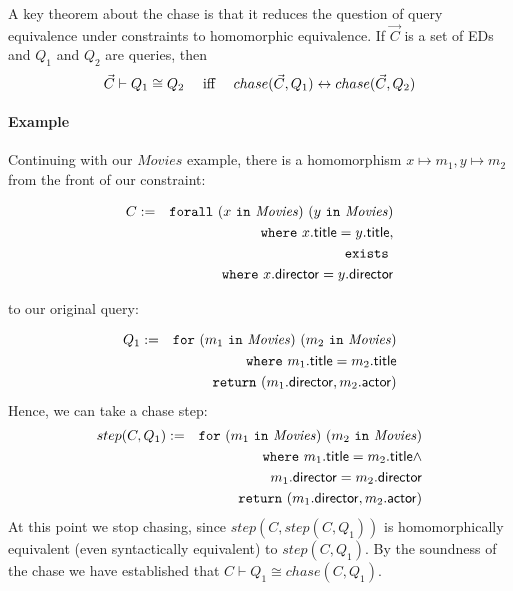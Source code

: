 \documentclass[preprint]{sigplanconf}
\newcommand{\FOR}{{\tt for} \ }
\newcommand{\FORALL}{{\tt forall} \ }
\newcommand{\EXISTS}{{\tt exists} \ }
\newcommand{\WHERE}{{\tt where} \ }
\newcommand{\IN}{ \ {\tt in} \ }
\newcommand{\RETURN}{{\tt return} \ }
\newcommand{\relation}[1]{\ensuremath{\mathit{#1}}\xspace}
\begin{document}
A key theorem about the chase is that it reduces the question of query equivalence under constraints to homomorphic equivalence.
If $\vec{C}$ is a set of EDs and $Q_1$ and $Q_2$ are queries, then
\[
\vec{C} \vdash Q_1 \cong Q_2 \ \ \ \  \textnormal{iff} \ \ \ \ chase(\vec{C},Q_1) \leftrightarrow chase(\vec{C}, Q_2)
\]
\paragraph{Example} Continuing with our \relation{Movies} example, there is a homomorphism $x \mapsto 
m_1, y \mapsto m_2$ from the front of our constraint: 
\begin{normalsize}
\begin{eqnarray*}
C& := & \FORALL (x \IN \relation{Movies}) \ (y \IN \relation{Movies}) \\
& & \WHERE x.{\sf title} = y.{\sf title}, \\ 
& & \EXISTS \\
& & \WHERE x.{\sf director} = y.{\sf director}
\end{eqnarray*}
\end{normalsize}
to our original query:

\begin{eqnarray*}
Q_1 & := & \FOR (m_1 \IN \relation{Movies}) \ (m_2 \IN \relation{Movies}) \\
 & & \WHERE m_1.{\sf title} = m_2.{\sf title} \\
 & & \RETURN (m_1.{\sf director}, m_2.{\sf actor})
\end{eqnarray*}
Hence, we can take a chase step:
\begin{eqnarray*}
step(C, Q_1) := & & \FOR (m_1 \IN \relation{Movies}) \ (m_2 \IN \relation{Movies}) \\
 & & \WHERE m_1.{\sf title} = m_2.{\sf title} \wedge \\
 & & \ \ \ \ \ \ \ \ \ \ \ \  m_1.{\sf director} = m_2.{\sf 
director} \\
 & & \RETURN (m_1.{\sf director}, m_2.{\sf actor})
\end{eqnarray*}
At this point we stop chasing, since $step(C, step(C, Q_1))$ is homomorphically equivalent (even syntactically equivalent) to $step(C, Q_1)$.
By the soundness of the chase we have established that $C \vdash Q_1 \cong chase(C, Q_1)$.
\end{document}
